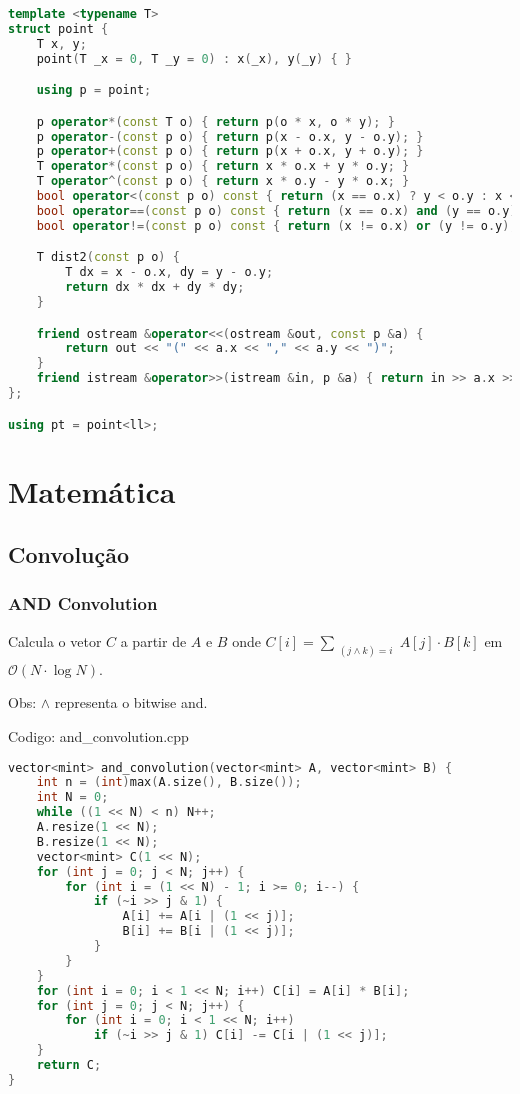 \documentclass[10pt, a4paper, oneside]{book}
\begin{document}
\begin{lstlisting}[language=C++]
template <typename T>
struct point {
    T x, y;
    point(T _x = 0, T _y = 0) : x(_x), y(_y) { }

    using p = point;

    p operator*(const T o) { return p(o * x, o * y); }
    p operator-(const p o) { return p(x - o.x, y - o.y); }
    p operator+(const p o) { return p(x + o.x, y + o.y); }
    T operator*(const p o) { return x * o.x + y * o.y; }
    T operator^(const p o) { return x * o.y - y * o.x; }
    bool operator<(const p o) const { return (x == o.x) ? y < o.y : x < o.x; }
    bool operator==(const p o) const { return (x == o.x) and (y == o.y); }
    bool operator!=(const p o) const { return (x != o.x) or (y != o.y); }

    T dist2(const p o) {
        T dx = x - o.x, dy = y - o.y;
        return dx * dx + dy * dy;
    }

    friend ostream &operator<<(ostream &out, const p &a) {
        return out << "(" << a.x << "," << a.y << ")";
    }
    friend istream &operator>>(istream &in, p &a) { return in >> a.x >> a.y; }
};

using pt = point<ll>;\end{lstlisting}
\hfill

\newpage

%
%
%
%

\chapter{Matemática}

\section{Convolução}
\subsection{AND Convolution}


Calcula o vetor $C$ a partir de $A$ e $B$ onde $C[i] = \sum_{\substack{(j \land k) = i}} A[j] \cdot B[k]$ em $\mathcal{O}(N \cdot \log N)$.



Obs: $\land$ representa o bitwise and.

\hfill

Codigo: and\_convolution.cpp

\begin{lstlisting}[language=C++]
vector<mint> and_convolution(vector<mint> A, vector<mint> B) {
    int n = (int)max(A.size(), B.size());
    int N = 0;
    while ((1 << N) < n) N++;
    A.resize(1 << N);
    B.resize(1 << N);
    vector<mint> C(1 << N);
    for (int j = 0; j < N; j++) {
        for (int i = (1 << N) - 1; i >= 0; i--) {
            if (~i >> j & 1) {
                A[i] += A[i | (1 << j)];
                B[i] += B[i | (1 << j)];
            }
        }
    }
    for (int i = 0; i < 1 << N; i++) C[i] = A[i] * B[i];
    for (int j = 0; j < N; j++) {
        for (int i = 0; i < 1 << N; i++)
            if (~i >> j & 1) C[i] -= C[i | (1 << j)];
    }
    return C;
}
\end{lstlisting}
\hfill
\end{document}
